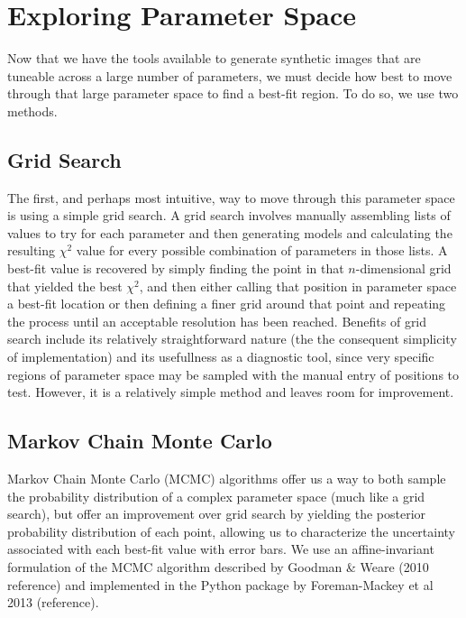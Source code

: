 \section{Exploring Parameter Space}
\label{section:param_space}

Now that we have the tools available to generate synthetic images that are tuneable across a large number of parameters, we must decide how best to move through that large parameter space to find a best-fit region. To do so, we use two methods.

\subsection{Grid Search}
The first, and perhaps most intuitive, way to move through this parameter space is using a simple grid search. A grid search involves manually assembling lists of values to try for each parameter and then generating models and calculating the resulting $\chi^2$ value for every possible combination of parameters in those lists. A best-fit value is recovered by simply finding the point in that $n$-dimensional grid that yielded the best $\chi^2$, and then either calling that position in parameter space a best-fit location or then defining a finer grid around that point and repeating the process until an acceptable resolution has been reached. Benefits of grid search include its relatively straightforward nature (the the consequent simplicity of implementation) and its usefullness as a diagnostic tool, since very specific regions of parameter space may be sampled with the manual entry of positions to test. However, it is a relatively simple method and leaves room for improvement.


\subsection{Markov Chain Monte Carlo}
\label{subsection:mcmc}

Markov Chain Monte Carlo (MCMC) algorithms offer us a way to both sample the probability distribution of a complex parameter space (much like a grid search), but offer an improvement over grid search by yielding the posterior probability distribution of each point, allowing us to characterize the uncertainty associated with each best-fit value with error bars. We use an affine-invariant formulation of the MCMC algorithm described by Goodman \& Weare (2010 reference) and implemented in the Python package  by Foreman-Mackey et al 2013 (reference).

